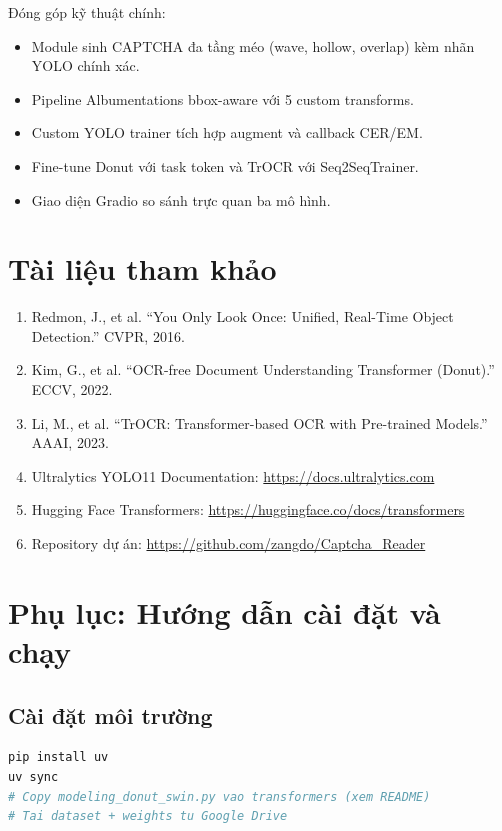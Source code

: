 \documentclass[a4paper,12pt]{report}
\begin{document}
Đóng góp kỹ thuật chính:
\begin{itemize}[leftmargin=*]
  \item Module sinh CAPTCHA đa tầng méo (wave, hollow, overlap) kèm nhãn YOLO chính xác.
  \item Pipeline Albumentations bbox-aware với 5 custom transforms.
  \item Custom YOLO trainer tích hợp augment và callback CER/EM.
  \item Fine-tune Donut với task token và TrOCR với Seq2SeqTrainer.
  \item Giao diện Gradio so sánh trực quan ba mô hình.
\end{itemize}

\chapter*{Tài liệu tham khảo}
\begin{enumerate}[leftmargin=*]
  \item Redmon, J., et al. ``You Only Look Once: Unified, Real-Time Object Detection.'' CVPR, 2016.
  \item Kim, G., et al. ``OCR-free Document Understanding Transformer (Donut).'' ECCV, 2022.
  \item Li, M., et al. ``TrOCR: Transformer-based OCR with Pre-trained Models.'' AAAI, 2023.
  \item Ultralytics YOLO11 Documentation: \url{https://docs.ultralytics.com}
  \item Hugging Face Transformers: \url{https://huggingface.co/docs/transformers}
  \item Repository dự án: \url{https://github.com/zangdo/Captcha_Reader}
\end{enumerate}

\appendix
\chapter{Phụ lục: Hướng dẫn cài đặt và chạy}

\section{Cài đặt môi trường}
\begin{lstlisting}[language=bash]
pip install uv
uv sync
# Copy modeling_donut_swin.py vao transformers (xem README)
# Tai dataset + weights tu Google Drive
\end{lstlisting}
\end{document}

